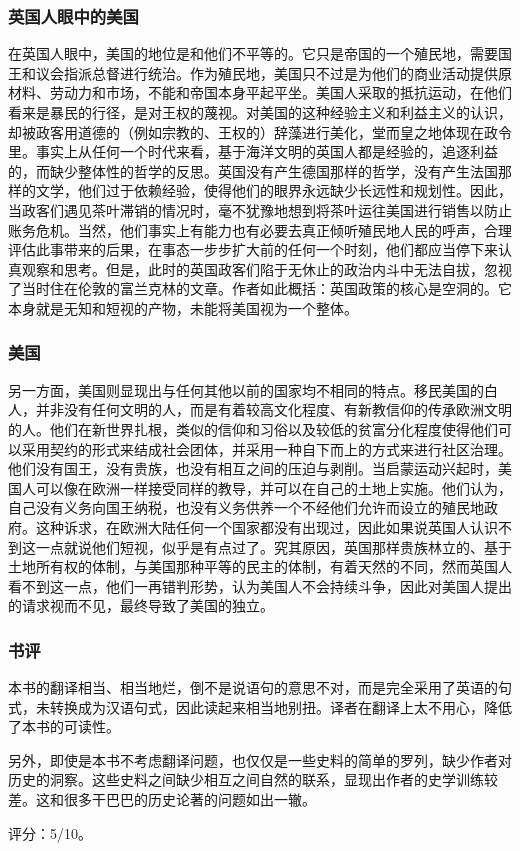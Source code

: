 \subsubsection{英国人眼中的美国}
在英国人眼中，美国的地位是和他们不平等的。它只是帝国的一个殖民地，需要国王和议会指派总督进行统治。作为殖民地，美国只不过是为他们的商业活动提供原材料、劳动力和市场，不能和帝国本身平起平坐。美国人采取的抵抗运动，在他们看来是暴民的行径，是对王权的蔑视。对美国的这种经验主义和利益主义的认识，却被政客用道德的（例如宗教的、王权的）辞藻进行美化，堂而皇之地体现在政令里。事实上从任何一个时代来看，基于海洋文明的英国人都是经验的，追逐利益的，而缺少整体性的哲学的反思。英国没有产生德国那样的哲学，没有产生法国那样的文学，他们过于依赖经验，使得他们的眼界永远缺少长远性和规划性。因此，当政客们遇见茶叶滞销的情况时，毫不犹豫地想到将茶叶运往美国进行销售以防止账务危机。当然，他们事实上有能力也有必要去真正倾听殖民地人民的呼声，合理评估此事带来的后果，在事态一步步扩大前的任何一个时刻，他们都应当停下来认真观察和思考。但是，此时的英国政客们陷于无休止的政治内斗中无法自拔，忽视了当时住在伦敦的富兰克林的文章。作者如此概括：英国政策的核心是空洞的。它本身就是无知和短视的产物，未能将美国视为一个整体。

\subsubsection{美国}
另一方面，美国则显现出与任何其他以前的国家均不相同的特点。移民美国的白人，并非没有任何文明的人，而是有着较高文化程度、有新教信仰的传承欧洲文明的人。他们在新世界扎根，类似的信仰和习俗以及较低的贫富分化程度使得他们可以采用契约的形式来结成社会团体，并采用一种自下而上的方式来进行社区治理。他们没有国王，没有贵族，也没有相互之间的压迫与剥削。当启蒙运动兴起时，美国人可以像在欧洲一样接受同样的教导，并可以在自己的土地上实施。他们认为，自己没有义务向国王纳税，也没有义务供养一个不经他们允许而设立的殖民地政府。这种诉求，在欧洲大陆任何一个国家都没有出现过，因此如果说英国人认识不到这一点就说他们短视，似乎是有点过了。究其原因，英国那样贵族林立的、基于土地所有权的体制，与美国那种平等的民主的体制，有着天然的不同，然而英国人看不到这一点，他们一再错判形势，认为美国人不会持续斗争，因此对美国人提出的请求视而不见，最终导致了美国的独立。

\subsubsection{书评}
本书的翻译相当、相当地烂，倒不是说语句的意思不对，而是完全采用了英语的句式，未转换成为汉语句式，因此读起来相当地别扭。译者在翻译上太不用心，降低了本书的可读性。

另外，即使是本书不考虑翻译问题，也仅仅是一些史料的简单的罗列，缺少作者对历史的洞察。这些史料之间缺少相互之间自然的联系，显现出作者的史学训练较差。这和很多干巴巴的历史论著的问题如出一辙。

评分：5/10。